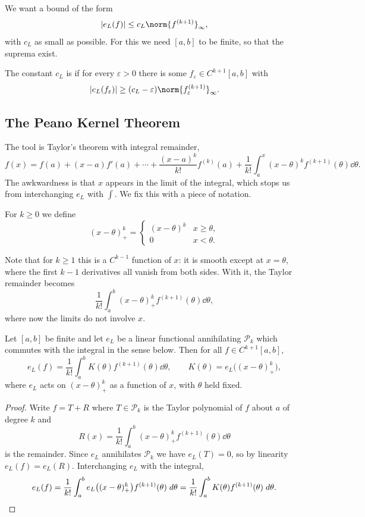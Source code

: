 \documentclass[a4paper]{scrartcl}
\providecommand{\abs}[1]{\left\lvert#1\right\rvert}
\renewcommand{\abs}[1]{\left\lvert#1\right\rvert}
\newcommand{\Pn}[1]{\mathcal{P}_{#1}}
\begin{document}
We want a bound of the form
$$
\abs{e_L(f)} \leq c_L \norm{f^{(k+1)}}_\infty,
$$
with $c_L$ as small as possible. For this we need $[a,b]$ to be finite, so that the suprema exist.

\begin{definition}
  The constant $c_L$ is  if for every $\varepsilon > 0$ there is some $f_\varepsilon \in C^{k+1}[a,b]$ with
  $$
  \abs{e_L(f_\varepsilon)} \geq (c_L - \varepsilon)\norm{f_\varepsilon^{(k+1)}}_\infty .
  $$
\end{definition}

\subsection{The Peano Kernel Theorem}

The tool is Taylor's theorem with integral remainder,
$$
f(x) = f(a) + (x-a)f'(a) + \cdots + \frac{(x-a)^k}{k!}f^{(k)}(a) + \frac{1}{k!}\int_a^x (x-\theta)^k f^{(k+1)}(\theta)\dd\theta .
$$
The awkwardness is that $x$ appears in the limit of the integral, which stops us from interchanging $e_L$ with $\int$. We fix this with a piece of notation.

\begin{definition}
  For $k \geq 0$ we define
  $$
  (x - \theta)_+^k = \begin{cases} (x-\theta)^k & x \geq \theta,\\ 0 & x < \theta.\end{cases}
  $$
\end{definition}

Note that for $k \geq 1$ this is a $C^{k-1}$ function of $x$: it is smooth except at $x = \theta$, where the first $k-1$ derivatives all vanish from both sides. With it, the Taylor remainder becomes
$$
\frac{1}{k!}\int_a^b (x-\theta)_+^k f^{(k+1)}(\theta)\dd\theta,
$$
where now the limits do not involve $x$.

\begin{theorem}\label{thm:peano}
  Let $[a,b]$ be finite and let $e_L$ be a linear functional annihilating $\Pn{k}$ which commutes with the integral in the sense below. Then for all $f \in C^{k+1}[a,b]$,
  $$
  e_L(f) = \frac{1}{k!}\int_a^b K(\theta) f^{(k+1)}(\theta)\dd\theta, \qquad K(\theta) = e_L\big((x-\theta)_+^k\big),
  $$
  where $e_L$ acts on $(x-\theta)_+^k$ as a function of $x$, with $\theta$ held fixed.
\end{theorem}
\begin{proof}
  Write $f = T + R$ where $T \in \Pn{k}$ is the Taylor polynomial of $f$ about $a$ of degree $k$ and
  $$
  R(x) = \frac{1}{k!}\int_a^b (x-\theta)_+^k f^{(k+1)}(\theta)\dd\theta
  $$
  is the remainder. Since $e_L$ annihilates $\Pn{k}$ we have $e_L(T) = 0$, so by linearity $e_L(f) = e_L(R)$. Interchanging $e_L$ with the integral,
  $$
  e_L(f) = \frac{1}{k!}\int_a^b e_L\big((x-\theta)_+^k\big)f^{(k+1)}(\theta)\; d\theta = \frac{1}{k!}\int_a^b K(\theta)f^{(k+1)}(\theta)\; d\theta. \qedhere
  $$
\end{proof}
\end{document}
